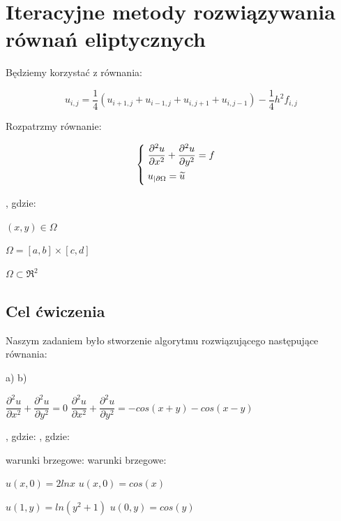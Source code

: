 \section{Iteracyjne metody rozwiązywania równań eliptycznych}

Będziemy korzystać z równania:

$$u_{i,j} = \frac{1}{4}(u_{i+1,j} + u_{i-1,j} + u_{i,j+1} + u_{i,j-1}) - \frac{1}{4}h^2f_{i,j}$$

\vspace{0.5cm}

Rozpatrzmy równanie:

\[
\begin{cases}
\vspace{0.1cm} 
\hspace{0,1cm}\dfrac{\partial^2 u}{\partial x^2} + \dfrac{\partial^2 u}{\partial y^2} = f\\
\vspace{0.1cm}
\hspace{0,1cm}u_{|\partial \Omega} = \widetilde{u} \\
\end{cases}
\]

, gdzie:

$(x,y) \in \Omega$

$\Omega = [a,b] \times [c,d]$

$\Omega \subset \Re^2$

\subsection{Cel ćwiczenia}

Naszym zadaniem było stworzenie algorytmu rozwiązującego następujące równania:

a) \hspace{6cm} b)

$\dfrac{\partial^2 u}{\partial x^2} + \dfrac{\partial^2 u}{\partial y^2} = 0$ \hspace{4.15cm} $\dfrac{\partial^2 u}{\partial x^2} + \dfrac{\partial^2 u}{\partial y^2} = -cos(x+y)-cos(x-y)$

, gdzie: \hspace{5.2cm} , gdzie:

warunki brzegowe: \hspace{3.5cm} warunki brzegowe:

$u(x,0) = 2lnx$ \hspace{4.15cm} $u(x,0) = cos(x)$

$u(1,y) = ln(y^2 + 1)$ \hspace{3.3cm} $u(0,y) = cos(y)$

